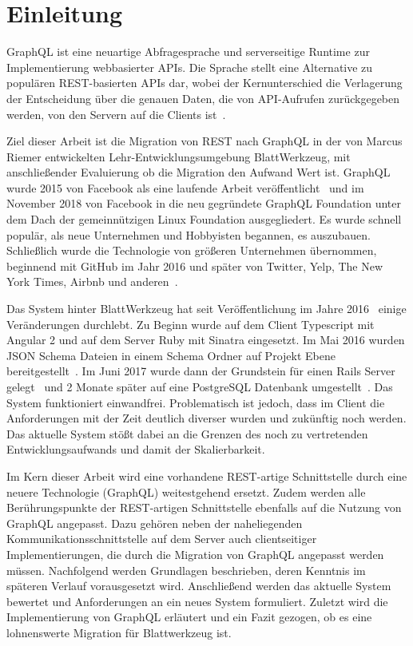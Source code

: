 
\chapter{Einleitung}
\label{sec:introduction}
GraphQL ist eine neuartige Abfragesprache und serverseitige Runtime zur Implementierung webbasierter APIs. Die Sprache
stellt eine Alternative zu populären REST-basierten APIs dar, wobei der Kernunterschied die
Verlagerung der Entscheidung über die genauen Daten, die von API-Aufrufen zurückgegeben werden, von den Servern auf die Clients ist~\cite{introduction}.
 
Ziel dieser Arbeit ist die Migration von REST nach GraphQL in der von Marcus Riemer entwickelten Lehr-Entwicklungsumgebung BlattWerkzeug, mit anschließender Evaluierung ob die Migration den Aufwand Wert ist. GraphQL wurde 2015 von Facebook als eine laufende Arbeit veröffentlicht~\cite{graphql-first-commit} und im November 2018 von Facebook in die neu gegründete GraphQL Foundation unter dem Dach der gemeinnützigen Linux Foundation ausgegliedert. Es wurde schnell populär, als neue Unternehmen und Hobbyisten begannen, es auszubauen. Schließlich wurde die Technologie von größeren Unternehmen übernommen, beginnend mit GitHub im Jahr 2016 und später von Twitter, Yelp, The New York Times, Airbnb und anderen~\cite{graphql-users}.

Das System hinter BlattWerkzeug hat seit Veröffentlichung im Jahre 2016~\cite{riemer2016} einige Veränderungen durchlebt. Zu Beginn wurde auf dem Client Typescript mit Angular 2 und auf dem Server Ruby mit Sinatra eingesetzt. Im Mai 2016 wurden JSON Schema Dateien in einem Schema Ordner auf Projekt Ebene bereitgestellt~\cite{riemerJSONSchemaCommit}.
Im Juni 2017 wurde dann der Grundstein für einen Rails Server gelegt~\cite{riemerRailsCommit} und 2 Monate später auf eine PostgreSQL Datenbank umgestellt~\cite{riemerPostgresCommit}. 
Das System funktioniert einwandfrei. Problematisch ist jedoch, dass im Client die Anforderungen mit der Zeit deutlich diverser wurden und zukünftig noch werden. 
Das aktuelle System stößt dabei an die Grenzen des noch zu vertretenden Entwicklungsaufwands und damit der Skalierbarkeit.

Im Kern dieser Arbeit wird eine vorhandene REST-artige Schnittstelle durch eine neuere Technologie (GraphQL) weitestgehend ersetzt. Zudem werden alle Berührungspunkte der REST-artigen Schnittstelle ebenfalls auf die Nutzung von GraphQL angepasst. Dazu gehören neben der naheliegenden Kommunikationsschnittstelle auf dem Server auch clientseitiger Implementierungen, die durch die Migration von GraphQL angepasst werden müssen. 
Nachfolgend werden Grundlagen beschrieben, deren Kenntnis im späteren Verlauf vorausgesetzt wird. Anschließend werden das aktuelle System bewertet und Anforderungen an ein neues System formuliert. Zuletzt wird die Implementierung von GraphQL
erläutert und ein Fazit gezogen, ob es eine lohnenswerte Migration für Blattwerkzeug ist.
 

